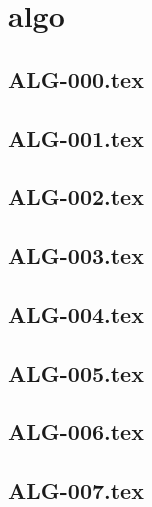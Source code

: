 \section*{algo}
\renewcommand{\xxexo}{ALG-000.tex} 
\subsection*{\xxexo} 
\graphicspath{{../../exos/algo/ALG-000/}}
 
 
\renewcommand{\xxexo}{ALG-001.tex} 
\subsection*{\xxexo} 
\graphicspath{{../../exos/algo/ALG-001/}}
 
 
\renewcommand{\xxexo}{ALG-002.tex} 
\subsection*{\xxexo} 
\graphicspath{{../../exos/algo/ALG-002/}}
 
 
\renewcommand{\xxexo}{ALG-003.tex} 
\subsection*{\xxexo} 
\graphicspath{{../../exos/algo/ALG-003/}}
 
 
\renewcommand{\xxexo}{ALG-004.tex} 
\subsection*{\xxexo} 
\graphicspath{{../../exos/algo/ALG-004/}}
 
 
\renewcommand{\xxexo}{ALG-005.tex} 
\subsection*{\xxexo} 
\graphicspath{{../../exos/algo/ALG-005/}}
 
 
\renewcommand{\xxexo}{ALG-006.tex} 
\subsection*{\xxexo} 
\graphicspath{{../../exos/algo/ALG-006/}}
 
 
\renewcommand{\xxexo}{ALG-007.tex} 
\subsection*{\xxexo} 
\graphicspath{{../../exos/algo/ALG-007/}}
 
 

